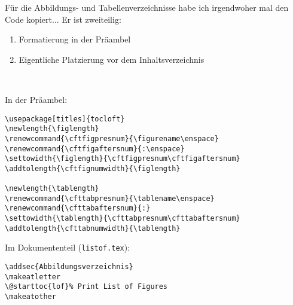 Für die Abbildungs- und Tabellenverzeichnisse habe ich irgendwoher
mal den Code kopiert... Er ist zweiteilig:
\begin{enumerate}
	\item Formatierung in der Präambel
	\item Eigentliche Platzierung vor dem Inhaltsverzeichnis
\end{enumerate}~

In der Präambel:
\begin{verbatim}
\usepackage[titles]{tocloft}
\newlength{\figlength}
\renewcommand{\cftfigpresnum}{\figurename\enspace}
\renewcommand{\cftfigaftersnum}{:\enspace}
\settowidth{\figlength}{\cftfigpresnum\cftfigaftersnum}
\addtolength{\cftfignumwidth}{\figlength}

\newlength{\tablength}
\renewcommand{\cfttabpresnum}{\tablename\enspace}
\renewcommand{\cfttabaftersnum}{:}
\settowidth{\tablength}{\cfttabpresnum\cfttabaftersnum}
\addtolength{\cfttabnumwidth}{\tablength}
\end{verbatim}

Im Dokumententeil (\texttt{listof.tex}):
\begin{verbatim}
\addsec{Abbildungsverzeichnis}
\makeatletter
\@starttoc{lof}% Print List of Figures
\makeatother
\end{verbatim}